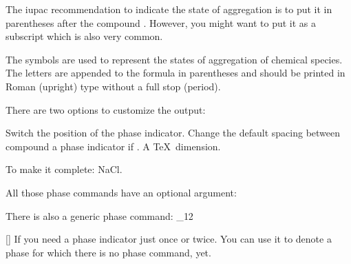 \documentclass[load-preamble+]{cnltx-doc}
\makeatletter
\renewenvironment{commands}
  {%
    \cnltx@set@catcode_{12}%
    \let\command\cnltx@command
    \cnltxlist
  }
  {\endcnltxlist}
\makeatother
\begin{document}
The \ac{iupac} recommendation to indicate the state of aggregation is to put
it in parentheses after the compound \cite{iupac:greenbook}.  However, you
might want to put it as a subscript which is also very common.

\begin{cnltxquote}
  The \textelp{} symbols are used to represent the states of aggregation of
  chemical species.  The letters are appended to the formula in parentheses
  and should be printed in Roman (upright) type without a full stop (period).
\end{cnltxquote}

There are two options to customize the output:
\begin{options}
    Switch the position of the phase indicator.
  \Default{.1333em}
    Change the default spacing between compound a phase indicator if
    . A \TeX\ dimension.
\end{options}
\begin{example}
  \par
  To make it complete: NaCl\aq.
\end{example}

All those phase commands have an optional argument:
\begin{example}
\end{example}

There is also a generic phase command:
\begin{commands}
  \command{phase}[]
    If you need a phase indicator just once or twice.  You can use it to
    denote a phase for which there is no phase command, yet.
\end{commands}
\end{document}

